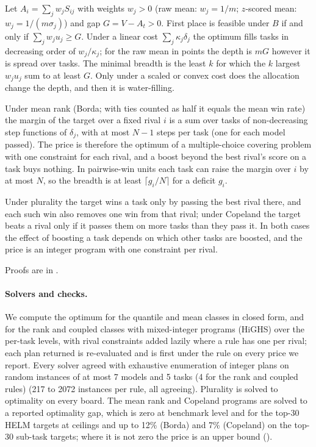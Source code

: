 \begin{proposition}\label{prop:mean}
Let $A_i=\sum_j w_jS_{ij}$ with weights $w_j>0$ (raw mean: $w_j=1/m$; $z$-scored mean: $w_j=1/(m\sigma_j)$) and gap $G=V-A_t>0$. First place is feasible under $B$ if and only if $\sum_jw_ju_j\ge G$. Under a linear cost $\sum_j\kappa_j\delta_j$ the optimum fills tasks in decreasing order of $w_j/\kappa_j$; for the raw mean in points the depth is $mG$ however it is spread over tasks. The minimal breadth is the least $k$ for which the $k$ largest $w_ju_j$ sum to at least $G$. Only under a scaled or convex cost does the allocation change the depth, and then it is water-filling.
\end{proposition}

\begin{proposition}\label{prop:rank}
Under mean rank (Borda; with ties counted as half it equals the mean win rate) the margin of the target over a fixed rival $i$ is a sum over tasks of non-decreasing step functions of $\delta_j$, with at most $N-1$ steps per task (one for each model passed). The price is therefore the optimum of a multiple-choice covering problem with one constraint for each rival, and a boost beyond the best rival's score on a task buys nothing. In pairwise-win units each task can raise the margin over $i$ by at most $N$, so the breadth is at least $\lceil g_i/N\rceil$ for a deficit $g_i$.
\end{proposition}

\begin{proposition}\label{prop:coupled}
Under plurality the target wins a task only by passing the best rival there, and each such win also removes one win from that rival; under Copeland the target beats a rival only if it passes them on more tasks than they pass it. In both cases the effect of boosting a task depends on which other tasks are boosted, and the price is an integer program with one constraint per rival.
\end{proposition}

Proofs are in .

\paragraph{Solvers and checks.}
We compute the optimum for the quantile and mean classes in closed form, and for the rank and coupled classes with mixed-integer programs (HiGHS) over the per-task levels, with rival constraints added lazily where a rule has one per rival; each plan returned is re-evaluated and is first under the rule on every price we report. Every solver agreed with exhaustive enumeration of integer plans on random instances of at most 7 models and 5 tasks (4 for the rank and coupled rules) (217 to 2072 instances per rule, all agreeing). Plurality is solved to optimality on every board. The mean rank and Copeland programs are solved to a reported optimality gap, which is zero at benchmark level and for the top-30 HELM targets at ceilings and up to 12\% (Borda) and 7\% (Copeland) on the top-30 sub-task targets; where it is not zero the price is an upper bound ().

